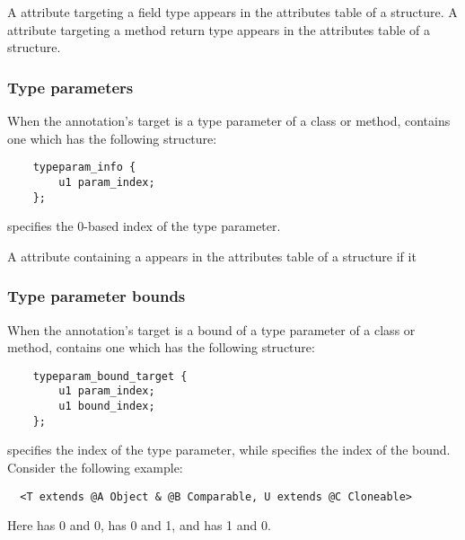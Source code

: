\documentclass[10pt]{article}
\begin{document}
A \RuntimeInOrVisibleTypeAnnotations attribute targeting a field
type appears in the attributes table of a  structure.
A \RuntimeInOrVisibleTypeAnnotations attribute targeting a method return
type appears in the attributes table of a  structure.

\subsubsection{Type parameters\label{class-file:ext:ri:mtp}}

When the annotation's target is a type parameter of a class or method,
 contains one  which has the
following structure:

\begin{Verbatim}
    typeparam_info {
        u1 param_index;
    };
\end{Verbatim}

 specifies the 0-based index of the type parameter.

A \RuntimeInOrVisibleTypeAnnotations attribute containing a
 appears in the attributes table of a
 structure if it 

\subsubsection{Type parameter bounds\label{class-file:ext:ri:tpbound}}

When the annotation's target is a bound of a type parameter of a class or
method,  contains one 
which has the following structure:

\begin{Verbatim}
    typeparam_bound_target {
        u1 param_index;
        u1 bound_index;
    };
\end{Verbatim}

 specifies the index of the type parameter, while
 specifies the index of the bound.  Consider the following
example:

\begin{Verbatim}
  <T extends @A Object & @B Comparable, U extends @C Cloneable>
\end{Verbatim}

\noindent
Here
 has  0 and  0,
 has  0 and  1, and
 has  1 and  0.
\end{document}

